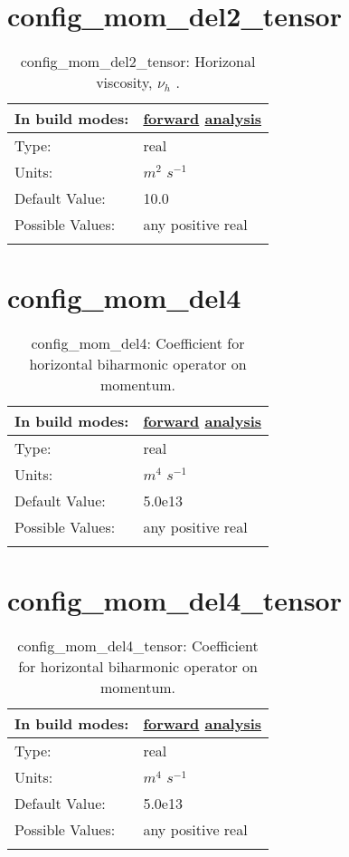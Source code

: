 \section[config\_mom\_del2\_tensor]{config\_mom\_del2\_tensor}
\label{sec:nm_sec_config_mom_del2_tensor}
\begin{center}
\begin{longtable}{| p{2.0in} || p{4.0in} |}
    \hline
    In build modes: & \hyperref[subsec:forward_nm_tab_hmix_del2_tensor]{forward} \hyperref[subsec:analysis_nm_tab_hmix_del2_tensor]{analysis} \\
    \hline
    Type: & real \\
    \hline
    Units: & $m^2$ $s^{-1}$ \\
    \hline
    Default Value: & 10.0 \\
    \hline
    Possible Values: & any positive real \\
    \hline
    \caption{config\_mom\_del2\_tensor:  Horizonal viscosity,  $\nu_h$ .}
\end{longtable}
\end{center}
\section[config\_mom\_del4]{config\_mom\_del4}
\label{sec:nm_sec_config_mom_del4}
\begin{center}
\begin{longtable}{| p{2.0in} || p{4.0in} |}
    \hline
    In build modes: & \hyperref[subsec:forward_nm_tab_hmix_del4]{forward} \hyperref[subsec:analysis_nm_tab_hmix_del4]{analysis} \\
    \hline
    Type: & real \\
    \hline
    Units: & $m^4$ $s^{-1}$ \\
    \hline
    Default Value: & 5.0e13 \\
    \hline
    Possible Values: & any positive real \\
    \hline
    \caption{config\_mom\_del4: Coefficient for horizontal biharmonic operator on momentum.}
\end{longtable}
\end{center}
\section[config\_mom\_del4\_tensor]{config\_mom\_del4\_tensor}
\label{sec:nm_sec_config_mom_del4_tensor}
\begin{center}
\begin{longtable}{| p{2.0in} || p{4.0in} |}
    \hline
    In build modes: & \hyperref[subsec:forward_nm_tab_hmix_del4_tensor]{forward} \hyperref[subsec:analysis_nm_tab_hmix_del4_tensor]{analysis} \\
    \hline
    Type: & real \\
    \hline
    Units: & $m^4$ $s^{-1}$ \\
    \hline
    Default Value: & 5.0e13 \\
    \hline
    Possible Values: & any positive real \\
    \hline
    \caption{config\_mom\_del4\_tensor: Coefficient for horizontal biharmonic operator on momentum.}
\end{longtable}
\end{center}
